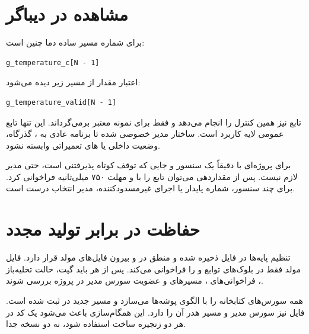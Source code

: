 \section{مشاهده در دیباگر}
برای شماره  مسیر ساده دما چنین است:

\begin{latin}
\begin{lstlisting}
g_temperature_c[N - 1]
\end{lstlisting}
\end{latin}

اعتبار مقدار از مسیر زیر دیده می‌شود:
\begin{latin}
\begin{lstlisting}
g_temperature_valid[N - 1]
\end{lstlisting}
\end{latin}
تابع  نیز همین کنترل را انجام می‌دهد و فقط برای نمونه معتبر  برمی‌گرداند. این تنها تابع عمومی لایه کاربرد است. ساختار مدیر خصوصی شده تا برنامه عادی به ، گذرگاه، وضعیت داخلی یا های تعمیراتی وابسته نشود.

برای پروژه‌ای با دقیقاً یک سنسور و جایی که توقف کوتاه پذیرفتنی است، حتی مدیر لازم نیست. پس از مقداردهی  می‌توان تابع  را با  و مهلت ۷۵۰ میلی‌ثانیه فراخوانی کرد. برای چند سنسور، شماره پایدار یا اجرای غیرمسدودکننده، مدیر انتخاب درست است.

\section{حفاظت در برابر تولید مجدد }
تنظیم پایه‌ها در فایل  ذخیره شده و منطق در  و  بیرون فایل‌های مولد قرار دارد. فایل مولد فقط در بلوک‌های  توابع  و  را فراخوانی می‌کند. پس از هر  باید  گیت، حالت تخلیه‌باز ، فراخوانی‌های ، مسیرهای  و عضویت سورس مدیر در پروژه  بررسی شوند.

 همه سورس‌های کتابخانه را با الگوی پوشه‌ها می‌سازد و مسیر  جدید در  ثبت شده است. فایل  نیز سورس مدیر و مسیر هدر آن را دارد. این همگام‌سازی باعث می‌شود یک کد  در هر دو زنجیره ساخت استفاده شود، نه دو نسخه جدا.

